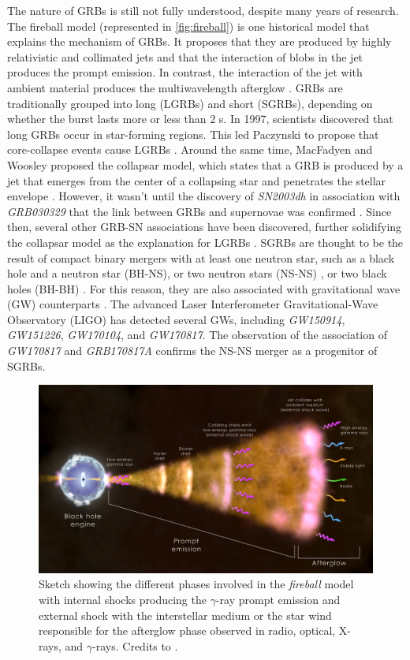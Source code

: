 The nature of GRBs is still not fully understood, despite many years of research. The fireball model (represented in \autoref{fig:fireball}) is one historical model that explains the mechanism of GRBs. It proposes that they are produced by highly relativistic and collimated jets and that the interaction of blobs in the jet produces the prompt emission. In contrast, the interaction of the jet with ambient material produces the multiwavelength afterglow \cite{Bhat_2011}. GRBs are traditionally grouped into long (LGRBs) and short (SGRBs), depending on whether the burst lasts more or less than 2 s. In 1997, scientists discovered that long GRBs occur in star-forming regions. This led Paczynski to propose that core-collapse events cause LGRBs \cite{paczynski_1998}. Around the same time, MacFadyen and Woosley proposed the collapsar model, which states that a GRB is produced by a jet that emerges from the center of a collapsing star and penetrates the stellar envelope \cite{macfadyen_woosley_1999}. However, it wasn't until the discovery of \textit{SN2003dh} in association with \textit{GRB030329} that the link between GRBs and supernovae was confirmed \cite{hjorth_et_al_2003}. Since then, several other GRB-SN associations have been discovered, further solidifying the collapsar model as the explanation for LGRBs \cite{bromberg2012observational}. SGRBs are thought to be the result of compact binary mergers with at least one neutron star, such as a black hole and a neutron star (BH-NS), or two neutron stars (NS-NS) \cite{cohen1995distribution}, or two black holes (BH-BH) \cite{Perna_2016}. For this reason, they are also associated with 
gravitational wave (GW) counterparts \cite{abbott_et_al_2017}. The advanced Laser Interferometer Gravitational-Wave Observatory (LIGO) has detected several GWs, including \textit{GW150914}, \textit{GW151226}, \textit{GW170104}, and \textit{GW170817}. The observation of the association of \textit{GW170817} and \textit{GRB170817A} \cite{abbott_et_al_2017} confirms the NS-NS merger as a progenitor of SGRBs.
 \begin{figure}[t]
\centering
\includegraphics[width=0.9\linewidth]{figures/introduction/grb_fireball.jpg}
\caption{Sketch showing the different phases involved in the \textit{fireball} model with internal shocks producing the $\gamma$-ray prompt emission and external shock with the interstellar medium or the star wind responsible
for the afterglow phase observed in radio, optical, X-rays, and $\gamma$-rays. Credits to \cite{fermiwebsite}.}
\label{fig:fireball}
\end{figure}

